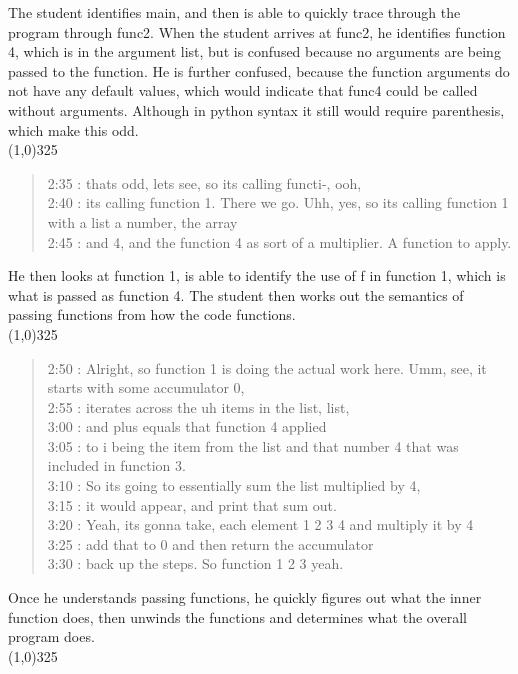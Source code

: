 \documentclass{article}
\begin{document}
The student identifies main, and then is able to quickly trace through the program through func2.
When the student arrives at func2, he identifies function 4, which is in the argument list, but is confused because no arguments are being passed to the function.
He is further confused, because the function arguments do not have any default values, which would indicate that func4 could be called without arguments.
Although in python syntax it still would require parenthesis, which make this odd. \\
\line(1,0){325}
\begin{quote}
2:35 : thats odd, lets see, so its calling functi-, ooh, \\
2:40 : its calling function 1. There we go. Uhh, yes, so its calling function 1 with a list a number, the array \\
2:45 : and 4, and the function 4 as sort of a multiplier. A function to apply. \\
\end{quote}

He then looks at function 1, is able to identify the use of f in function 1, which is what is passed as function 4.
The student then works out the semantics of passing functions from how the code functions. \\
\line(1,0){325}
\begin{quote}
2:50 : Alright, so function 1 is doing the actual work here. Umm, see, it starts with some accumulator 0,  \\
2:55 : iterates across the uh items in the list, list, \\
3:00 : and plus equals that function 4 applied \\
3:05 : to i being the item from the list and that number 4 that was included in function 3. \\
3:10 : So its going to essentially sum the list multiplied by 4, \\
3:15 : it would appear, and print that sum out. \\
3:20 : Yeah, its gonna take, each element 1 2 3 4 and multiply it by 4 \\
3:25 : add that to 0 and then return the accumulator \\
3:30 : back up the steps. So function 1 2 3 yeah. \\
\end{quote}

Once he understands passing functions, he quickly figures out what the inner function does, then unwinds the functions and determines what the overall program does. \\
\line(1,0){325}
\end{document}
